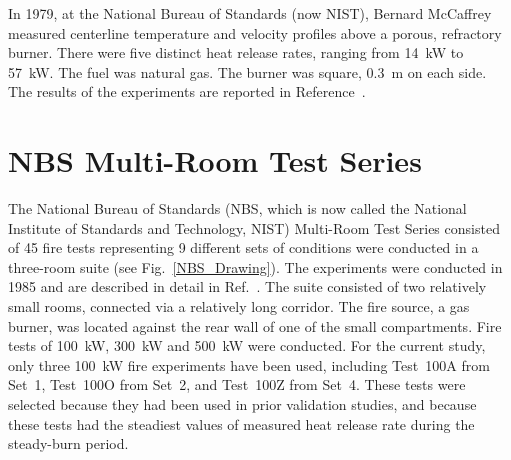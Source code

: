 In 1979, at the National Bureau of Standards (now NIST), Bernard McCaffrey measured centerline temperature and velocity profiles above a porous, refractory burner.
There were five distinct heat release rates, ranging from 14~kW to 57~kW. The fuel was natural gas. The burner was square, 0.3~m on each side.
The results of the experiments are reported in Reference~\cite{McCaffrey:NBSIR_79-1910}.


\section{NBS Multi-Room Test Series}

The National Bureau of Standards (NBS, which is now called the National Institute of Standards
and Technology, NIST) Multi-Room Test Series consisted of 45 fire tests representing
9 different sets of conditions were conducted in a three-room suite (see Fig.~\ref{NBS_Drawing}). The experiments were
conducted in 1985 and are described in detail in Ref.~\cite{Peacock:NBS_Multi-Room}. The suite consisted of two relatively
small rooms, connected via a relatively long corridor. The fire source, a gas burner, was located
against the rear wall of one of the small compartments.
Fire tests of 100~kW, 300~kW and 500~kW were conducted. For the current study, only three 100~kW fire experiments have been used,
including Test~100A from Set~1, Test~100O from Set~2, and Test~100Z from Set~4. These tests
were selected because they had been used in prior validation studies, and because these tests had the
steadiest values of measured heat release rate during the steady-burn period.

